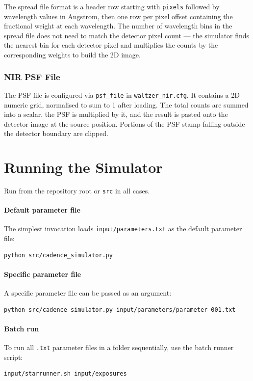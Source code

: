 The spread file format is a header row starting with \texttt{pixels} followed by wavelength values in Angstrom, then one row per pixel offset containing the fractional weight at each wavelength. The number of wavelength bins in the spread file does not need to match the detector pixel count — the simulator finds the nearest bin for each detector pixel and multiplies the counts by the corresponding weights to build the 2D image.

\subsubsection{NIR PSF File}

The PSF file is configured via \texttt{psf\_file} in \texttt{waltzer\_nir.cfg}. It contains a 2D numeric grid, normalised to sum to 1 after loading. The total counts are summed into a scalar, the PSF is multiplied by it, and the result is pasted onto the detector image at the source position. Portions of the PSF stamp falling outside the detector boundary are clipped.
\newpage

\section{Running the Simulator}

Run from the repository root or \texttt{src} in all cases.

\paragraph{Default parameter file}
The simplest invocation loads \texttt{input/parameters.txt} as the default parameter file:
\begin{verbatim}
python src/cadence_simulator.py
\end{verbatim}

\paragraph{Specific parameter file}
A specific parameter file can be passed as an argument:
\begin{verbatim}
python src/cadence_simulator.py input/parameters/parameter_001.txt
\end{verbatim}

\paragraph{Batch run}
To run all \texttt{.txt} parameter files in a folder sequentially, use the batch runner script:
\begin{verbatim}
input/starrunner.sh input/exposures
\end{verbatim}

